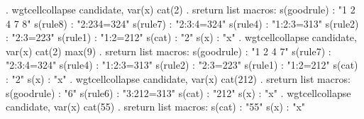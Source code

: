 . wgtcellcollapse candidate, var(x) cat(2)
{\smallskip}
. sreturn list
{\smallskip}
macros:
           s(goodrule) : "1 2 4 7 8"
              s(rule8) : "2:234=324"
              s(rule7) : "2:3:4=324"
              s(rule4) : "1:2:3=313"
              s(rule2) : "2:3=223"
              s(rule1) : "1:2=212"
                s(cat) : "2"
                  s(x) : "x"
{\smallskip}
. wgtcellcollapse candidate, var(x) cat(2) max(9)
{\smallskip}
. sreturn list
{\smallskip}
macros:
           s(goodrule) : "1 2 4 7"
              s(rule7) : "2:3:4=324"
              s(rule4) : "1:2:3=313"
              s(rule2) : "2:3=223"
              s(rule1) : "1:2=212"
                s(cat) : "2"
                  s(x) : "x"
{\smallskip}
\cnp
. wgtcellcollapse candidate, var(x) cat(212)
{\smallskip}
. sreturn list
{\smallskip}
macros:
           s(goodrule) : "6"
              s(rule6) : "3:212=313"
                s(cat) : "212"
                  s(x) : "x"
{\smallskip}
. wgtcellcollapse candidate, var(x) cat(55)
{\smallskip}
. sreturn list
{\smallskip}
macros:
                s(cat) : "55"
                  s(x) : "x"
